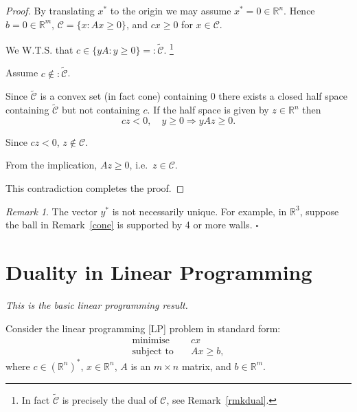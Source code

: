 \documentclass[a4paper]{amsart}
\theoremstyle{plain}
\theoremstyle{definition}
\theoremstyle{remark}
\newtheorem{remark}[theorem]{Remark}
\begin{document}
\begin{proof}
 By translating $ x^* $ to the origin we may assume $ x^* = 0 \in \mathbb{R}^n $. Hence  $ b = 0 \in \mathbb{R}^m $, 
$\mathcal{C} = \{ x : Ax \geq 0 \} $, and $ cx\geq 0 $ for $ x \in \mathcal{C} $.

We W.T.S.
 that   
 $ c \in   \{ yA : y \geq 0 \} =:\widetilde{\mathcal{C}} $.
 \footnote{In fact $  \widetilde{\mathcal{C} }$  is precisely the dual   of   $ \mathcal{C} $, see Remark~\ref{rmkdual}.}

  
Assume $ c \notin :\widetilde{\mathcal{C}} $. 

Since $ \widetilde{\mathcal{C}}$ is a convex set (in fact cone) containing $ 0 $ there exists a closed half space containing $ \widetilde{\mathcal{C}}$ but not containing $ c $. If the half space is given by $ z\in \mathbb{R}^n  $ then 
\[  cz < 0, \quad y \geq 0 \Longrightarrow yAz \geq 0 .\]

Since $ cz < 0 $, $ z \notin \mathcal{C} $. 

From the implication, $ Az \geq 0 $, i.e.\  $ z \in \mathcal{C} $.  

This contradiction completes the proof.
\end{proof} 




 
 \begin{remark} The vector $ y^* $ is not necessarily unique.  For example, in $ \mathbb{R}^3 $, suppose the ball in Remark~\ref{cone}  is supported by 4 or more walls.
\hfill $\square$  \end{remark}  
 
 
 
 
\section{\textbf{Duality in Linear Programming}}   

\noindent \emph{This is the basic linear programming result.} 



 \bigskip 
Consider the linear programming [LP] problem in standard form:
\begin{equation} \label{primal}
\begin{aligned}
\text{minimise} \quad & cx \\
\text{subject to} \quad & Ax \geq b ,
\end{aligned}
\end{equation} 
where $ c \in (\mathbb{R}^n )^* $, $ x \in \mathbb{R}^n $, $ A $ is an $ m\times n $ matrix, and $ b \in \mathbb{R}^m$.  
 
\end{document}

